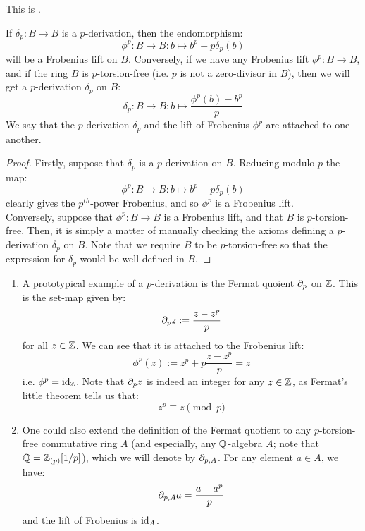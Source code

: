             \begin{proposition} \label{prop: p_derivations_and_frobenius_lifts}
                This is \cite[Remark 2.2]{bhatt_scholze_prisms}.
                
                If $\delta_p: B \to B$ is a $p$-derivation, then the endomorphism:
                    $$\phi^p: B \to B: b \mapsto b^p + p\delta_p(b)$$
                will be a Frobenius lift on $B$. Conversely, if we have any Frobenius lift $\phi^p: B \to B$, and if the ring $B$ is $p$-torsion-free (i.e. $p$ is not a zero-divisor in $B$), then we will get a $p$-derivation $\delta_p$ on $B$:
                    $$\delta_p: B \to B: b \mapsto \frac{\phi^p(b) - b^p}{p}$$
                We say that the $p$-derivation $\delta_p$ and the lift of Frobenius $\phi^p$ are attached to one another.
            \end{proposition}
                \begin{proof}
                    Firstly, suppose that $\delta_p$ is a $p$-derivation on $B$. Reducing modulo $p$ the map:
                        $$\phi^p: B \to B: b \mapsto b^p + p\delta_p(b)$$
                    clearly gives the $p^{th}$-power Frobenius, and so $\phi^p$ is a Frobenius lift. 
                    \\
                    Conversely, suppose that $\phi^p: B \to B$ is a Frobenius lift, and that $B$ is $p$-torsion-free. Then, it is simply a matter of manually checking the axioms defining a $p$-derivation $\delta_p$ on $B$. Note that we require $B$ to be $p$-torsion-free so that the expression for $\delta_p$ would be well-defined in $B$.
                \end{proof}
            \begin{example} \label{example: p_derivations}
                \noindent
                \begin{enumerate}
                    \item A prototypical example of a $p$-derivation is the Fermat quoient $\partial_p$ on $\mathbb{Z}$. This is the set-map given by:
                        $$\partial_p z := \frac{z - z^p}{p}$$
                    for all $z \in \mathbb{Z}$. We can see that it is attached to the Frobenius lift:
                        $$\phi^p(z) := z^p + p \frac{z - z^p}{p} = z$$
                    i.e. $\phi^p = \mathrm{id}_{\mathbb{Z}}$. Note that $\partial_p z$ is indeed an integer for any $z \in \mathbb{Z}$, as Fermat's little theorem tells us that:
                        $$z^p \equiv z \pmod{p}$$
                    \item One could also extend the definition of the Fermat quotient to any $p$-torsion-free commutative ring $A$ (and especially, any $\mathbb{Q}$-algebra $A$; note that $\mathbb{Q} = \mathbb{Z}_{(p)}[1/p]$), which we will denote by $\partial_{p,A}$. For any element $a \in A$, we have:
                        $$\partial_{p,A}a = \frac{a - a^p}{p}$$
                    and the lift of Frobenius is $\mathrm{id}_A$.
                \end{enumerate}
            \end{example}
                
